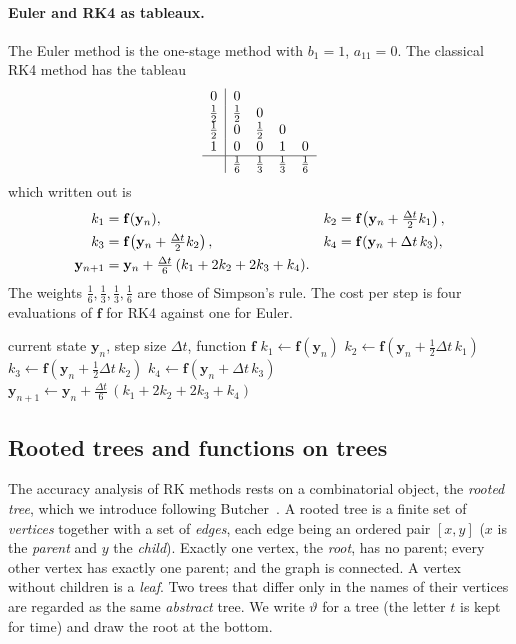 \documentclass[11pt,a4paper]{article}
\newcommand{\Dt}{\Delta t}
\newcommand{\bfy}{\mathbf{y}}
\newcommand{\bff}{\mathbf{f}}
\begin{document}
\paragraph{Euler and RK4 as tableaux.} The Euler method is the one-stage method with $b_1=1$,
$a_{11}=0$. The classical RK4 method has the tableau
\begin{equation}
\begin{array}{c|cccc}
0 & 0 & & & \\
\tfrac12 & \tfrac12 & 0 & & \\
\tfrac12 & 0 & \tfrac12 & 0 & \\
1 & 0 & 0 & 1 & 0\\ \hline
 & \tfrac16 & \tfrac13 & \tfrac13 & \tfrac16
\end{array}
\end{equation}
which written out is
\begin{align}
k_1&=\bff(\bfy_n), & k_2&=\bff\!\left(\bfy_n+\tfrac{\Dt}{2}k_1\right),\notag\\
k_3&=\bff\!\left(\bfy_n+\tfrac{\Dt}{2}k_2\right), & k_4&=\bff(\bfy_n+\Dt\,k_3),\notag\\
\bfy_{n+1}&=\bfy_n+\tfrac{\Dt}{6}\,(k_1+2k_2+2k_3+k_4).
\label{eq:rk4}
\end{align}
The weights $\tfrac16,\tfrac13,\tfrac13,\tfrac16$ are those of Simpson's rule. The cost per step is four
evaluations of $\bff$ for RK4 against one for Euler.

\begin{algorithm}[H]
\caption{One step of classical RK4 for $\bfy'=\bff(\bfy)$}\label{alg:rk4}
\begin{algorithmic}[1]
\Require current state $\bfy_n$, step size $\Dt$, function $\bff$
\State $k_1\gets \bff(\bfy_n)$
\State $k_2\gets \bff(\bfy_n+\tfrac12\Dt\,k_1)$
\State $k_3\gets \bff(\bfy_n+\tfrac12\Dt\,k_2)$
\State $k_4\gets \bff(\bfy_n+\Dt\,k_3)$
\State \Return $\bfy_{n+1}\gets \bfy_n+\tfrac{\Dt}{6}\,(k_1+2k_2+2k_3+k_4)$
\end{algorithmic}
\end{algorithm}

\subsection{Rooted trees and functions on trees}\label{sec:trees}

The accuracy analysis of RK methods rests on a combinatorial object, the \emph{rooted tree}, which we
introduce following Butcher~\cite[Sect.~30]{butcher2008}. A rooted tree is a finite set of
\emph{vertices} together with a set of \emph{edges}, each edge being an ordered pair $[x,y]$ ($x$ is the
\emph{parent} and $y$ the \emph{child}). Exactly one vertex, the \emph{root}, has no parent; every other
vertex has exactly one parent; and the graph is connected. A vertex without children is a \emph{leaf}.
Two trees that differ only in the names of their vertices are regarded as the same \emph{abstract} tree.
We write $\vartheta$ for a tree (the letter $t$ is kept for time) and draw the root at the bottom.
\end{document}
